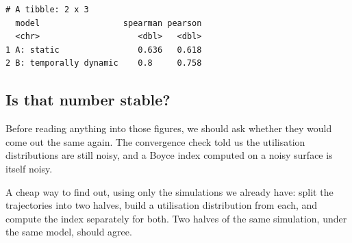 \documentclass[
  letterpaper,
  DIV=11,
  numbers=noendperiod]{scrartcl}
\newenvironment{Shaded}{\begin{snugshade}}{\end{snugshade}}
\newcommand{\AttributeTok}[1]{\textcolor[rgb]{0.40,0.45,0.13}{#1}}
\newcommand{\FunctionTok}[1]{\textcolor[rgb]{0.28,0.35,0.67}{#1}}
\newcommand{\NormalTok}[1]{\textcolor[rgb]{0.00,0.23,0.31}{#1}}
\newcommand{\OtherTok}[1]{\textcolor[rgb]{0.00,0.23,0.31}{#1}}
\newcommand{\SpecialCharTok}[1]{\textcolor[rgb]{0.37,0.37,0.37}{#1}}
\newcommand{\StringTok}[1]{\textcolor[rgb]{0.13,0.47,0.30}{#1}}
\begin{document}
\begin{Shaded}
\end{Shaded}

\begin{verbatim}
# A tibble: 2 x 3
  model                 spearman pearson
  <chr>                    <dbl>   <dbl>
1 A: static                0.636   0.618
2 B: temporally dynamic    0.8     0.758
\end{verbatim}

\subsection{Is that number stable?}\label{is-that-number-stable}

Before reading anything into those figures, we should ask whether they
would come out the same again. The convergence check told us the
utilisation distributions are still noisy, and a Boyce index computed on
a noisy surface is itself noisy.

A cheap way to find out, using only the simulations we already have:
split the trajectories into two halves, build a utilisation distribution
from each, and compute the index separately for both. Two halves of the
same simulation, under the same model, should agree.
\end{document}

